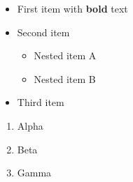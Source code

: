\documentclass{article}
\begin{document}
\begin{itemize}
  \item First item with \textbf{bold} text
  \item Second item
  \begin{itemize}
    \item Nested item A
    \item Nested item B
  \end{itemize}
  \item Third item
\end{itemize}
\begin{enumerate}
  \item Alpha
  \item Beta
  \item Gamma
\end{enumerate}
\end{document}
